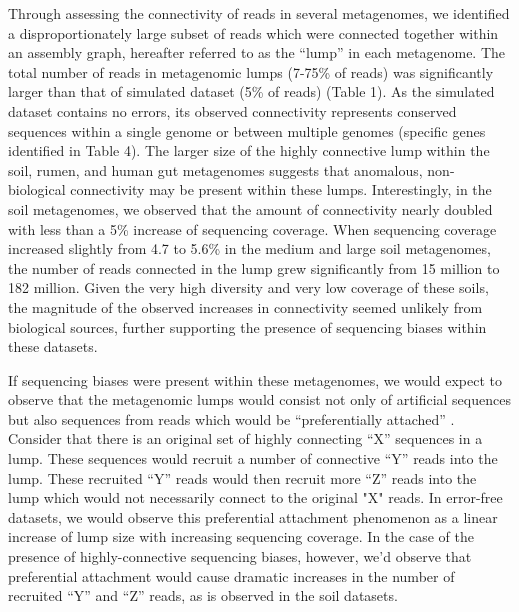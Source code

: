 \documentclass[10pt]{article}
\begin{document}
Through assessing the connectivity of reads in several metagenomes, we identified a disproportionately large subset of reads which were connected together within an assembly graph, hereafter referred to as the ``lump'' in each metagenome.  The total number of reads in metagenomic lumps (7-75\% of reads) was significantly larger than that of simulated dataset (5\% of reads) (Table 1).  As the simulated dataset contains no errors, its observed connectivity represents conserved sequences within a single genome or between multiple genomes (specific genes identified in Table 4).  The larger size of the highly connective lump within the soil, rumen, and human gut metagenomes suggests that anomalous, non-biological connectivity may be present within these lumps.  Interestingly, in the soil metagenomes, we observed that the amount of connectivity nearly doubled with less than a 5\% increase of sequencing coverage.  When sequencing coverage increased slightly from 4.7 to 5.6\% in the medium and large soil metagenomes, the number of reads connected in the lump grew significantly from 15 million to 182 million.  Given the very high diversity and very low coverage of these soils, the magnitude of the observed increases in connectivity seemed unlikely from biological sources, further supporting the presence of sequencing biases within these datasets.  

If sequencing biases were present within these metagenomes, we would expect to observe that the metagenomic lumps would consist not only of artificial sequences but also sequences from reads which would be ``preferentially attached'' \cite{Barabasi:1999p1083}.  Consider that there is an original set of highly connecting ``X'' sequences in a lump.  These sequences would recruit a number of connective ``Y'' reads into the lump.  These recruited ``Y'' reads would then recruit more ``Z'' reads into the lump which would not necessarily connect to the original "X" reads.  In error-free datasets, we would observe this preferential attachment phenomenon as a linear increase of lump size with increasing sequencing coverage.  In the case of the presence of highly-connective sequencing biases, however, we'd observe that preferential attachment would cause dramatic increases in the number of recruited ``Y'' and ``Z'' reads, as is observed in the soil datasets.   
\end{document}

